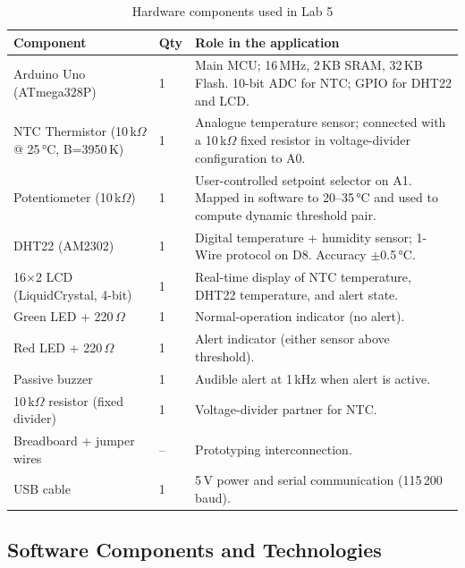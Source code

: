 \documentclass[12pt]{article}
\begin{document}
\begin{table}[H]
\centering
\begin{tabular}{p{4.2cm} p{1.8cm} p{7cm}}
\toprule
\textbf{Component} & \textbf{Qty} & \textbf{Role in the application} \\
\midrule
Arduino Uno (ATmega328P) & 1 & Main MCU; 16\,MHz, 2\,KB SRAM, 32\,KB Flash. 10-bit ADC for NTC; GPIO for DHT22 and LCD. \\
NTC Thermistor (10\,k$\Omega$ @ 25\,°C, B=3950\,K) & 1 & Analogue temperature sensor; connected with a 10\,k$\Omega$ fixed resistor in voltage-divider configuration to A0. \\
Potentiometer (10\,k$\Omega$) & 1 & User-controlled setpoint selector on A1. Mapped in software to 20--35\,°C and used to compute dynamic threshold pair. \\
DHT22 (AM2302) & 1 & Digital temperature + humidity sensor; 1-Wire protocol on D8. Accuracy $\pm$0.5\,°C. \\
16$\times$2 LCD (LiquidCrystal, 4-bit) & 1 & Real-time display of NTC temperature, DHT22 temperature, and alert state. \\
Green LED + 220\,$\Omega$ & 1 & Normal-operation indicator (no alert). \\
Red LED + 220\,$\Omega$ & 1 & Alert indicator (either sensor above threshold). \\
Passive buzzer & 1 & Audible alert at 1\,kHz when alert is active. \\
10\,k$\Omega$ resistor (fixed divider) & 1 & Voltage-divider partner for NTC. \\
Breadboard + jumper wires & -- & Prototyping interconnection. \\
USB cable & 1 & 5\,V power and serial communication (115\,200 baud). \\
\bottomrule
\end{tabular}
\caption{Hardware components used in Lab 5}
\label{tab:hardware}
\end{table}

\subsection{Software Components and Technologies}
\end{document}

